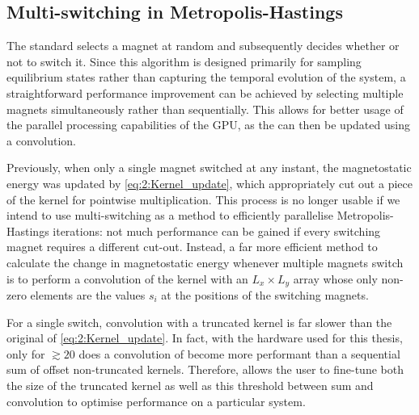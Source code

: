 \subsection{Multi-switching in Metropolis-Hastings} \label{sec:2:MultiSwitch}
The standard  selects a magnet at random and subsequently decides whether or not to switch it.
Since this algorithm is designed primarily for sampling equilibrium states rather than capturing the temporal evolution of the system, a straightforward performance improvement can be achieved by selecting multiple magnets simultaneously rather than sequentially.
This allows for better usage of the parallel processing capabilities of the GPU, as the  can then be updated using a convolution. \\\par
Previously, when only a single magnet switched at any instant, the magnetostatic energy was updated by \cref{eq:2:Kernel_update}, which appropriately cut out a piece of the kernel for pointwise multiplication.
This process is no longer usable if we intend to use multi-switching as a method to efficiently parallelise Metropolis-Hastings iterations: not much performance can be gained if every switching magnet requires a different cut-out.
Instead, a far more efficient method to calculate the change in magnetostatic energy whenever multiple magnets switch is to perform a convolution of the kernel with an $L_x \times L_y$ array whose only non-zero elements are the values $s_i$ at the positions of the switching magnets. \\\par
For a single switch, convolution with a truncated kernel is far slower than the original  of \eqref{eq:2:Kernel_update}.
In fact, with the hardware used for this thesis, only for $\gtrsim 20$  does a convolution of  become more performant than a sequential sum of offset non-truncated kernels.
Therefore, \hotspice allows the user to fine-tune both the size of the truncated kernel as well as this threshold between sum and convolution to optimise performance on a particular system.

